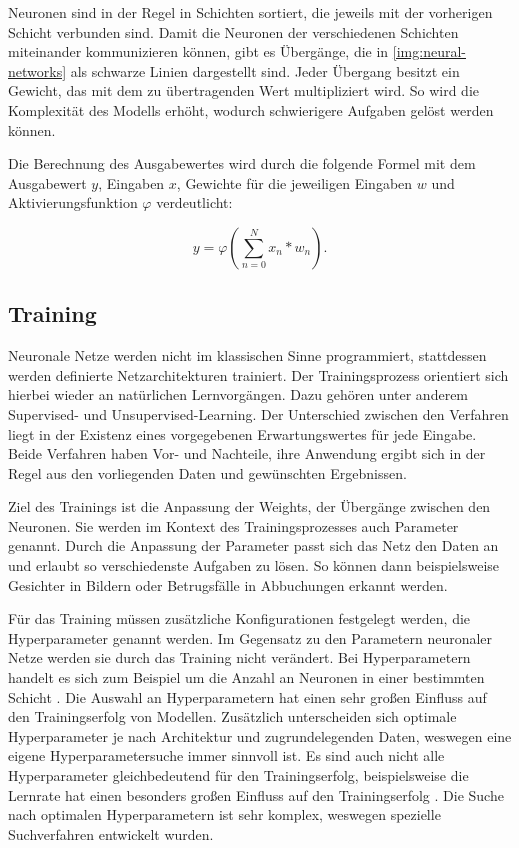 Neuronen sind in der Regel in Schichten sortiert, die jeweils mit der vorherigen Schicht verbunden sind.
Damit die Neuronen der verschiedenen Schichten miteinander kommunizieren können, gibt es Übergänge, die in \cref{img:neural-networks} als schwarze Linien dargestellt sind.
Jeder Übergang besitzt ein Gewicht, das mit dem zu übertragenden Wert multipliziert wird.
So wird die Komplexität des Modells erhöht, wodurch schwierigere Aufgaben gelöst werden können.
\newline

Die Berechnung des Ausgabewertes wird durch die folgende Formel mit dem Ausgabewert $y$, Eingaben $x$, Gewichte für die jeweiligen Eingaben $w$ und Aktivierungsfunktion $\varphi$ verdeutlicht:

\begin{equation}
	y = \varphi ( \sum_{n=0}^N x_n * w_n).
\end{equation}

\subsection{Training}
Neuronale Netze werden nicht im klassischen Sinne programmiert, stattdessen werden definierte Netzarchitekturen trainiert.
Der Trainingsprozess orientiert sich hierbei wieder an natürlichen Lernvorgängen.
Dazu gehören unter anderem Supervised- und Unsupervised-Learning.
Der Unterschied zwischen den Verfahren liegt in der Existenz eines vorgegebenen Erwartungswertes für jede Eingabe.
Beide Verfahren haben Vor- und Nachteile, ihre Anwendung ergibt sich in der Regel aus den vorliegenden Daten und gewünschten Ergebnissen.

Ziel des Trainings ist die Anpassung der Weights, der Übergänge zwischen den Neuronen.
Sie werden im Kontext des Trainingsprozesses auch Parameter genannt.
Durch die Anpassung der Parameter passt sich das Netz den Daten an und erlaubt so verschiedenste Aufgaben zu lösen.
So können dann beispielsweise Gesichter in Bildern oder Betrugsfälle in Abbuchungen erkannt werden.
\newline

Für das Training müssen zusätzliche Konfigurationen festgelegt werden, die Hyperparameter genannt werden.
Im Gegensatz zu den Parametern neuronaler Netze werden sie durch das Training nicht verändert.
Bei Hyperparametern handelt es sich zum Beispiel um die Anzahl an Neuronen in einer bestimmten Schicht \cite{hyperparameters-gan-using-genetic-algorithm}.
Die Auswahl an Hyperparametern hat einen sehr großen Einfluss auf den Trainingserfolg von Modellen.
Zusätzlich unterscheiden sich optimale Hyperparameter je nach Architektur und zugrundelegenden Daten, weswegen eine eigene Hyperparametersuche immer sinnvoll ist. 
Es sind auch nicht alle Hyperparameter gleichbedeutend für den Trainingserfolg, beispielsweise die Lernrate hat einen besonders großen Einfluss auf den Trainingserfolg \cite{learning-rate-most-important}.
Die Suche nach optimalen Hyperparametern ist sehr komplex, weswegen spezielle Suchverfahren entwickelt wurden. 

